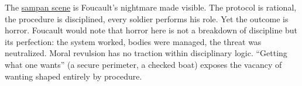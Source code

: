The \hyperref[scene:sampan]{sampan scene} is Foucault's nightmare made visible. The protocol
is rational, the procedure is disciplined, every soldier performs his role. Yet the outcome is
horror. Foucault would note that horror here is not a breakdown of discipline but its
perfection: the system worked, bodies
were managed, the threat was neutralized. Moral revulsion has no traction within disciplinary
logic. ``Getting what one wants'' (a secure perimeter, a checked boat) exposes the vacancy of
wanting shaped entirely by procedure.
